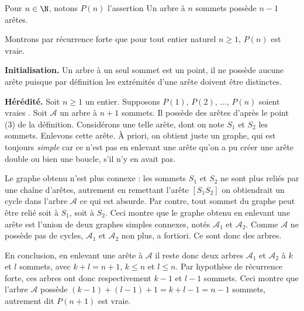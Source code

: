 \begin{Soln}{46}
Pour $n\in \N$, notons $P(n)$ l'assertion \og Un arbre à $n$ sommets possède $n-1$ arêtes.\fg

Montrons par récurrence forte que pour tout entier naturel $n\geq 1$, $P(n)$ est vraie.

  \textbf{Initialisation.} Un arbre à un seul sommet est un point, il ne possède aucune arête puisque par définition les extrémités d'une arête doivent être distinctes.

  \textbf{Hérédité.} Soit $n\geq 1$ un entier. Supposons $P(1)$, $P(2)$, ..., $P(n)$ soient vraies . Soit $\mathcal A$ un arbre à $n+1$ sommets. Il possède des arêtes d'après le point (3) de la définition. Considérons une telle arête, dont on note $S_1$ et $S_2$ les sommets. Enlevons cette arête. À priori, on obtient juste un graphe, qui est toujours \emph{simple} car ce n'est pas en enlevant une arête qu'on a pu créer une arête double ou bien une boucle, s'il n'y en avait pas.

Le graphe obtenu n'est plus connexe :  les sommets $S_1$ et $S_2$ ne sont plus reliés par une chaîne d'arêtes, autrement en remettant l'arête $[S_1S_2]$ on obtiendrait un cycle dans l'arbre $\mathcal A$ ce qui est absurde. Par contre, tout sommet du graphe peut être relié soit à $S_1$, soit à $S_2$. Ceci montre que le graphe obtenu en enlevant une arête est l'union de deux graphes simples connexes, notés $\mathcal A_1$ et $\mathcal A_2$. Comme $\mathcal A$ ne possède pas de cycles, $\mathcal A_1$ et $\mathcal A_2$ non plus, a fortiori. Ce sont donc des arbres.

En conclusion, en enlevant une arête à $\mathcal A$ il reste donc deux arbres $\mathcal A_1$ et $\mathcal A_2$ à $k$ et $l$ sommets, avec $k+l=n+1$, $k\leq n$ et $l\leq n$. Par hypothèse de récurrence forte, ces arbres ont donc respectivement $k-1$ et $l-1$ sommets. Ceci montre que l'arbre $\mathcal A$ possède $(k-1)+(l-1)+1 = k+l-1=n-1$ sommets, autrement dit $P(n+1)$ est vraie.

\end{Soln}
